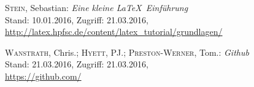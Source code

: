 \begin{thebibliography}{999}
 \textsc{Stein}, Sebastian: \textit{Eine kleine \LaTeX \  Einführung}\\
			{\small Stand: 10.01.2016, Zugriff: 21.03.2016,} \\
			\url{http://latex.hpfsc.de/content/latex_tutorial/grundlagen/}
		
 \textsc{Wanstrath}, Chris.; \textsc{Hyett}, PJ.; \textsc{Preston-Werner}, Tom.:  \textit{Github}\\ 
			{\small Stand: 21.03.2016, Zugriff: 21.03.2016,}\\ 			
			\url{https://github.com/}			
			
\end{thebibliography}
